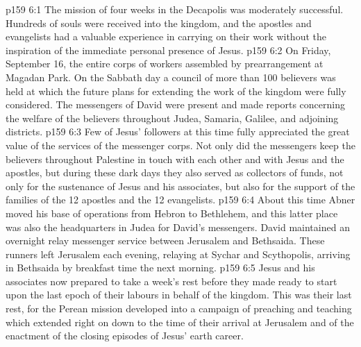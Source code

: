 \vs p159 6:1 The mission of four weeks in the Decapolis was moderately successful. Hundreds of souls were received into the kingdom, and the apostles and evangelists had a valuable experience in carrying on their work without the inspiration of the immediate personal presence of Jesus.
\vs p159 6:2 On Friday, September 16, the entire corps of workers assembled by prearrangement at Magadan Park. On the Sabbath day a council of more than 100 believers was held at which the future plans for extending the work of the kingdom were fully considered. The messengers of David were present and made reports concerning the welfare of the believers throughout Judea, Samaria, Galilee, and adjoining districts.
\vs p159 6:3 Few of Jesus’ followers at this time fully appreciated the great value of the services of the messenger corps. Not only did the messengers keep the believers throughout Palestine in touch with each other and with Jesus and the apostles, but during these dark days they also served as collectors of funds, not only for the sustenance of Jesus and his associates, but also for the support of the families of the 12 apostles and the 12 evangelists.
\vs p159 6:4 About this time Abner moved his base of operations from Hebron to Bethlehem, and this latter place was also the headquarters in Judea for David’s messengers. David maintained an overnight relay messenger service between Jerusalem and Bethsaida. These runners left Jerusalem each evening, relaying at Sychar and Scythopolis, arriving in Bethsaida by breakfast time the next morning.
\vs p159 6:5 Jesus and his associates now prepared to take a week’s rest before they made ready to start upon the last epoch of their labours in behalf of the kingdom. This was their last rest, for the Perean mission developed into a campaign of preaching and teaching which extended right on down to the time of their arrival at Jerusalem and of the enactment of the closing episodes of Jesus’ earth career.
\quizlink
